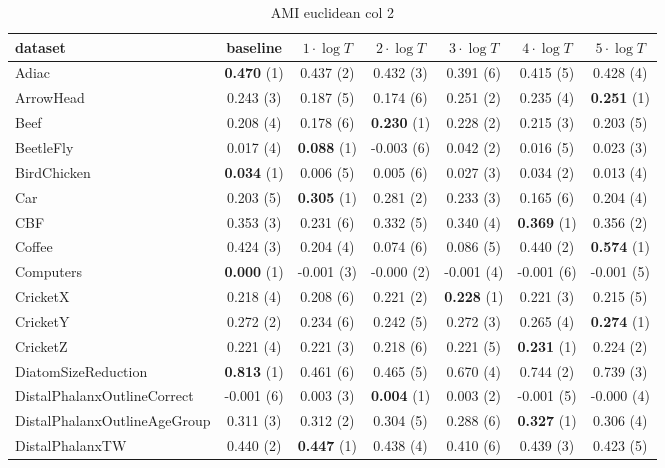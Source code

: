     \begin{table}[ht]
    \caption{AMI euclidean col 2} 
    \begin{adjustbox}{width=\textwidth}
    \begin{tabular}{lcccccc}
    \hline
    dataset & baseline & \textbf{$1\cdot \log{T}$} & \textbf{$2\cdot \log{T}$} & \textbf{$3\cdot \log{T}$} & \textbf{$4\cdot \log{T}$} & \textbf{$5\cdot \log{T}$} \\ \hline
    Adiac & \textbf{0.470} (1) & 0.437 (2) & 0.432 (3) & 0.391 (6) & 0.415 (5) & 0.428 (4) \\
    ArrowHead & 0.243 (3) & 0.187 (5) & 0.174 (6) & 0.251 (2) & 0.235 (4) & \textbf{0.251} (1) \\
    Beef & 0.208 (4) & 0.178 (6) & \textbf{0.230} (1) & 0.228 (2) & 0.215 (3) & 0.203 (5) \\
    BeetleFly & 0.017 (4) & \textbf{0.088} (1) & -0.003 (6) & 0.042 (2) & 0.016 (5) & 0.023 (3) \\
    BirdChicken & \textbf{0.034} (1) & 0.006 (5) & 0.005 (6) & 0.027 (3) & 0.034 (2) & 0.013 (4) \\
    Car & 0.203 (5) & \textbf{0.305} (1) & 0.281 (2) & 0.233 (3) & 0.165 (6) & 0.204 (4) \\
    CBF & 0.353 (3) & 0.231 (6) & 0.332 (5) & 0.340 (4) & \textbf{0.369} (1) & 0.356 (2) \\
    Coffee & 0.424 (3) & 0.204 (4) & 0.074 (6) & 0.086 (5) & 0.440 (2) & \textbf{0.574} (1) \\
    Computers & \textbf{0.000} (1) & -0.001 (3) & -0.000 (2) & -0.001 (4) & -0.001 (6) & -0.001 (5) \\
    CricketX & 0.218 (4) & 0.208 (6) & 0.221 (2) & \textbf{0.228} (1) & 0.221 (3) & 0.215 (5) \\
    CricketY & 0.272 (2) & 0.234 (6) & 0.242 (5) & 0.272 (3) & 0.265 (4) & \textbf{0.274} (1) \\
    CricketZ & 0.221 (4) & 0.221 (3) & 0.218 (6) & 0.221 (5) & \textbf{0.231} (1) & 0.224 (2) \\
    DiatomSizeReduction & \textbf{0.813} (1) & 0.461 (6) & 0.465 (5) & 0.670 (4) & 0.744 (2) & 0.739 (3) \\
    DistalPhalanxOutlineCorrect & -0.001 (6) & 0.003 (3) & \textbf{0.004} (1) & 0.003 (2) & -0.001 (5) & -0.000 (4) \\
    DistalPhalanxOutlineAgeGroup & 0.311 (3) & 0.312 (2) & 0.304 (5) & 0.288 (6) & \textbf{0.327} (1) & 0.306 (4) \\
    DistalPhalanxTW & 0.440 (2) & \textbf{0.447} (1) & 0.438 (4) & 0.410 (6) & 0.439 (3) & 0.423 (5) \\

\end{tabular}
\end{adjustbox}
\end{table}

